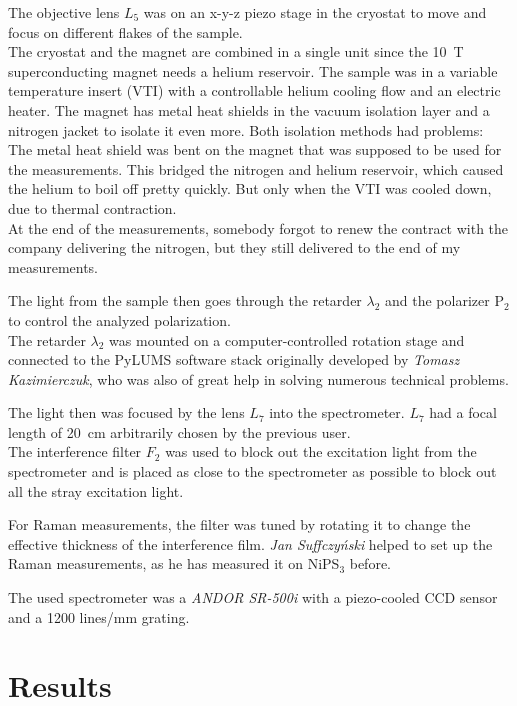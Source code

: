 \documentclass[
	oneside,
	parskip=half,
	a4paper,
]{scrbook}
\begin{document}
The objective lens $L_5$ was on an x-y-z piezo stage in the cryostat to move and focus on different flakes of the sample.\\
The cryostat and the magnet are combined in a single unit since the \SI{10}{T} superconducting magnet needs a helium reservoir.
The sample was in a variable temperature insert (VTI) with a controllable helium cooling flow and an electric heater.
The magnet has metal heat shields in the vacuum isolation layer and a nitrogen jacket to isolate it even more.
Both isolation methods had problems:\\
The metal heat shield was bent on the magnet that was supposed to be used for the measurements.
This bridged the nitrogen and helium reservoir, which caused the helium to boil off pretty quickly.
But only when the VTI was cooled down, due to thermal contraction.\\
At the end of the measurements, somebody forgot to renew the contract with the company delivering the nitrogen, but they still delivered to the end of my measurements.

The light from the sample then goes through the retarder $\lambda_2$ and the polarizer P$_2$ to control the analyzed polarization.\\
The retarder $\lambda_2$ was mounted on a computer-controlled rotation stage and connected to the PyLUMS software stack originally developed by \textit{Tomasz Kazimierczuk}, who was also of great help in solving numerous technical problems.

The light then was focused by the lens $L_7$ into the spectrometer.
$L_7$ had a focal length of \SI{20}{cm} arbitrarily chosen by the previous user.\\
The interference filter $F_2$ was used to block out the excitation light from the spectrometer and is placed as close to the spectrometer as possible to block out all the stray excitation light.

For Raman measurements, the filter was tuned by rotating it to change the effective thickness of the interference film.
\textit{Jan Suffczyński} helped to set up the Raman measurements, as he has measured it on NiPS$_3$ before. 

The used spectrometer was a \textit{ANDOR SR-500i} with a piezo-cooled CCD sensor and a 1200 lines/mm grating.


\chapter{Results}
\end{document}
